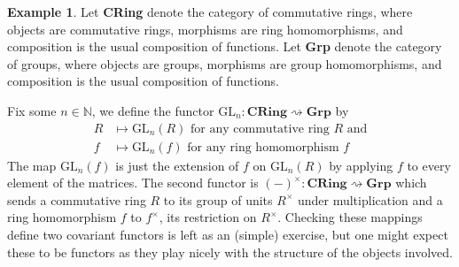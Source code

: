 \documentclass{scrartcl}
\theoremstyle{definition}
\newtheorem{exmp}[thm]{Example}
\theoremstyle{remark}
\newcommand{\N}{\mathbb{N}}
\newcommand{\gln}{\text{GL}_n}
\begin{document}
\begin{exmp}
Let \textbf{CRing} denote the category of commutative rings, where objects are commutative rings, morphisms are ring homomorphisms, and composition is the usual composition of functions. Let \textbf{Grp} denote the category of groups, where objects are groups, morphisms are group homomorphisms, and composition is the usual composition of functions.

Fix some $n \in \N$, we define the functor $\gln:\textbf{CRing} \rightsquigarrow \textbf{Grp}$ by 
\begin{align*}
    R &\mapsto \gln(R) \mbox{ for any commutative ring $R$ and} \\
    f &\mapsto \gln(f) \mbox{ for any ring homomorphism $f$}
\end{align*}
The map $\gln(f)$ is just the extension of $f$ on $\gln(R)$ by applying $f$ to every element of the matrices. The second functor is $(-)^{\times}:\textbf{CRing} \rightsquigarrow \textbf{Grp}$ which sends a commutative ring $R$ to its group of units $R^{\times}$ under multiplication and a ring homomorphism $f$ to $f^{\times}$, its restriction on $R^{\times}$. Checking these mappings define two covariant functors is left as an (simple) exercise, but one might expect these to be functors as they play nicely with the structure of the objects involved.


\end{exmp}
\end{document}
